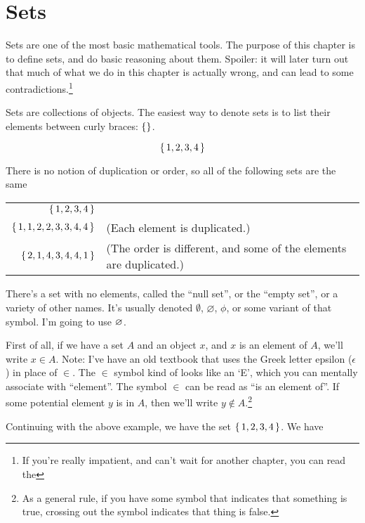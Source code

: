 \chapter{Sets}

Sets are one of the most basic mathematical tools. The purpose of this
chapter is to define sets, and do basic reasoning about them. Spoiler:
it will later turn out that much of what we do in this chapter is
actually wrong, and can lead to some contradictions.\footnote{If
  you're really impatient, and can't wait for another chapter, you can
  read the }

Sets are collections of objects. The easiest way to denote sets is to
list their elements between curly braces: $\left\{  \right\}$.

\begin{displaymath}
  \left\{ \, 1,2,3,4 \, \right\}
\end{displaymath}

There is no notion of duplication or order, so all of the following
sets are the same

\begin{tabu}to 
  $\left\{ \, 1,2,3,4 \, \right\}$         & \\
  $\left\{ \, 1,1,2,2,3,3,4,4 \, \right\}$ & (Each element is duplicated.) \\
  $\left\{ \, 2,1,4,3,4,4,1 \, \right\}$   & (The order is different, and some of the elements are duplicated.)
\end{tabu}

There's a set with no elements, called the ``null set'', or the
``empty set'', or a variety of other names. It's usually denoted
$\emptyset$, $\varnothing$, $\phi$, or some variant of that
symbol. I'm going to use $\varnothing$.


First of all, if we have a set $A$ and an object $x$, and $x$ is an
element of $A$, we'll write $x \in A$. Note: I've have an old textbook
that uses the Greek letter epsilon ($\epsilon$) in place of $\in$. The
$\in$ symbol kind of looks like an `E', which you can mentally
associate with ``element''. The symbol $\in$ can be read as ``is an
element of''. If some potential element $y$ is  in $A$, then
we'll write $y \notin A$.\footnote{As a general rule, if you have some
  symbol that indicates that something is true, crossing out the
  symbol indicates that thing is false.}

Continuing with the above example, we have the set
$\left\{ \, 1,2,3,4 \, \right\}$. We have

